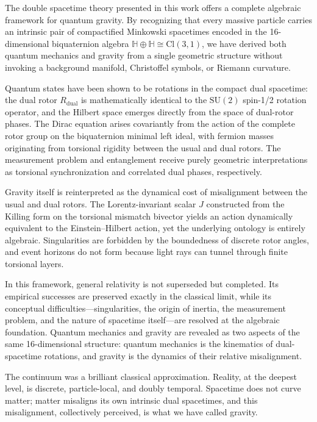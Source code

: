 \documentclass[dvipdfmx,11pt,a4paper]{article}
\begin{document}
The double spacetime theory presented in this work offers a complete algebraic framework for quantum gravity. By recognizing that every massive particle carries an intrinsic pair of compactified Minkowski spacetimes encoded in the 16-dimensional biquaternion algebra $\mathbb{H} \oplus \mathbb{H} \cong \mathrm{Cl}(3,1)$, we have derived both quantum mechanics and gravity from a single geometric structure without invoking a background manifold, Christoffel symbols, or Riemann curvature.

Quantum states have been shown to be rotations in the compact dual spacetime: the dual rotor $R_\text{dual}$ is mathematically identical to the $\mathrm{SU}(2)$ spin-1/2 rotation operator, and the Hilbert space emerges directly from the space of dual-rotor phases. The Dirac equation arises covariantly from the action of the complete rotor group on the biquaternion minimal left ideal, with fermion masses originating from torsional rigidity between the usual and dual rotors. The measurement problem and entanglement receive purely geometric interpretations as torsional synchronization and correlated dual phases, respectively.

Gravity itself is reinterpreted as the dynamical cost of misalignment between the usual and dual rotors. The Lorentz-invariant scalar $J$ constructed from the Killing form on the torsional mismatch bivector yields an action dynamically equivalent to the Einstein--Hilbert action, yet the underlying ontology is entirely algebraic. Singularities are forbidden by the boundedness of discrete rotor angles, and event horizons do not form because light rays can tunnel through finite torsional layers.

In this framework, general relativity is not superseded but completed. Its empirical successes are preserved exactly in the classical limit, while its conceptual difficulties—singularities, the origin of inertia, the measurement problem, and the nature of spacetime itself—are resolved at the algebraic foundation. Quantum mechanics and gravity are revealed as two aspects of the same 16-dimensional structure: quantum mechanics is the kinematics of dual-spacetime rotations, and gravity is the dynamics of their relative misalignment.

The continuum was a brilliant classical approximation. Reality, at the deepest level, is discrete, particle-local, and doubly temporal. Spacetime does not curve matter; matter misaligns its own intrinsic dual spacetimes, and this misalignment, collectively perceived, is what we have called gravity.
\end{document}
